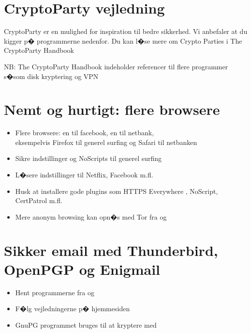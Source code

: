 \documentclass[20pt,a4paper,footrule]{report}
\begin{document}
\normal

\section*{CryptoParty vejledning}

CryptoParty er en mulighed for inspiration til bedre sikkerhed. Vi anbefaler at du kigger p� programmerne nedenfor. Du kan l�se mere om Crypto Parties i The CryptoParty Handbook\\

NB: The CryptoParty Handbook indeholder referencer til flere programmer s�som disk kryptering og VPN

\section*{Nemt og hurtigt: flere browsere}


\begin{itemize}
\item Flere browsere: en til facebook, en til netbank,\\
eksempelvis Firefox til generel surfing og Safari til netbanken
\item Sikre indstillinger og NoScripts til generel surfing
\item L�sere indstillinger til Netflix, Facebook m.fl.
\item Husk at installere gode plugins som HTTPS Everywhere , NoScript, CertPatrol m.fl.
\item Mere anonym browsing kan opn�s med Tor fra  og 
\end{itemize}

\section*{Sikker email med Thunderbird, OpenPGP og Enigmail}

\begin{itemize}
\item Hent programmerne fra  og 
\item F�lg vejledningerne p� hjemmesiden 
\item GnuPG programmet bruges til at kryptere med 
\end{itemize}
\end{document}
